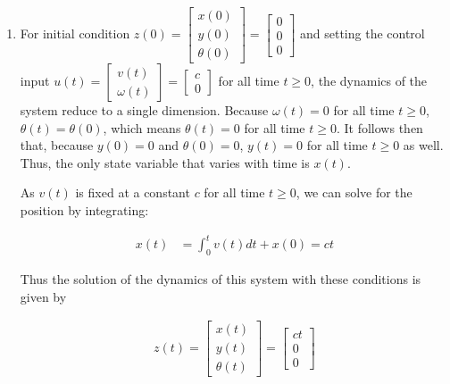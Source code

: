 \documentclass[11pt]{article}
\theoremstyle{definition}
\begin{document}
\begin{enumerate}
\begin{enumerate}
        \item %
        For initial condition $z(0) = \begin{bmatrix} x(0) \\ y(0) \\ \theta(0) \end{bmatrix} = \begin{bmatrix} 0 \\ 0 \\ 0 \end{bmatrix}$ and setting the control input $u(t) = \begin{bmatrix} v(t) \\ \omega(t) \end{bmatrix} =  \begin{bmatrix} c \\ 0 \end{bmatrix}$ for all time $t \ge 0$, the dynamics of the system reduce to a single dimension.  Because $\omega(t) = 0$ for all time $t \ge 0$, $\theta(t) = \theta(0)$, which means $\theta(t) = 0$ for all time $t \ge 0$.  It follows then that, because $y(0) = 0$ and $\theta(0) = 0$, $y(t) = 0$ for all time $t \ge 0$ as well.  Thus, the only state variable that varies with time is $x(t)$.

        As $v(t)$ is fixed at a constant $c$ for all time $t \ge 0$, we can solve for the position by integrating:

        \begin{align}
            x(t) &= \int_0^t v(t) dt + x(0) = ct
        \end{align}

        Thus the solution of the dynamics of this system with these conditions is given by 

        \begin{align}
            z(t) = \begin{bmatrix} x(t) \\ y(t) \\ \theta(t) \end{bmatrix} = \begin{bmatrix} ct \\ 0 \\ 0 \end{bmatrix}
        \end{align}


\end{enumerate}
\end{enumerate}
\end{document}
